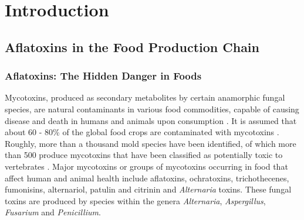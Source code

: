 \chapter{Introduction} \label{Introduction} 

\clearpage

\section{Aflatoxins in the Food Production Chain} \label{subchap:AFs_introduction}

\subsection{Aflatoxins: The Hidden Danger in Foods} \label{subchap:mycotoxins}

Mycotoxins, produced as secondary metabolites by certain anamorphic fungal species, are natural contaminants in various food commodities, capable of causing disease and death in humans and animals upon consumption \citep{bennett2003clinical}. It is assumed that about 60 - 80\% of the global food crops are contaminated with mycotoxins \citep{eskola2020worldwide}. Roughly, more than a thousand mold species have been identified, of which more than 500 produce mycotoxins that have been classified as potentially toxic to vertebrates \citep{haque2020mycotoxin}. Major mycotoxins or groups of mycotoxins occurring in food that affect human and animal health include aflatoxins, ochratoxins, trichothecenes, fumonisins, alternariol, patulin and citrinin and \textit{Alternaria} toxins. These fungal toxins are produced by species within the genera \textit{Alternaria}, \textit{Aspergillus}, \textit{Fusarium} and \textit{Penicillium}. 


